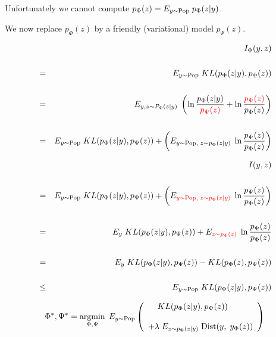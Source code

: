 {

Unfortunately we cannot compute {\color{red} $p_\Phi(z) = E_{y \sim \mathrm{Pop}}\;p_\Phi(z|y)$}.

\vfill
We now replace {\color{red} $p_\Phi(z)$} by a friendly (variational) model {\color{red} $p_\Psi(z)$}.

\begin{eqnarray*}
 & & I_\Phi(y,z) \\
 \\
 & = & E_{y \sim \mathrm{Pop}}\; KL(p_\Phi(z|y),p_\Phi(z)) \\
\\
& = & E_{y,z\sim P_\Phi(z|y)}\; \left(\ln \frac{p_\Phi(z|y)}{{\color{red} p_\Psi(z)}} + \ln \frac{{\color{red} p_\Psi(z)}}{p_\Phi(z)}\right) \\
\\
& = & E_{y \sim \mathrm{Pop}}\;KL(p_\Phi(z|y),p_\Psi(z)) + \left(E_{y \sim \mathrm{Pop},\;z\sim p_\Phi(z|y)}\;\ln \frac{p_\Psi(z)}{p_\Phi(z)}\right)
\end{eqnarray*}


\begin{eqnarray*}
 & & I(y,z) \\
 \\
 & = & E_{y \sim \mathrm{Pop}}\;KL(p_\Phi(z|y),p_\Psi(z)) + \left(E_{\color{red} y \sim \mathrm{Pop},\;z\sim p_\Phi(z|y)}\;\ln \frac{p_\Psi(z)}{p_\Phi(z)}\right) \\
\\
& = & E_y\;KL(p_\Phi(z|y),p_\Psi(z)) + E_{\color{red} z\sim p_\Phi(z)}\;\ln \frac{p_\Psi(z)}{p_\Phi(z)} \\
\\
& = & E_y\;KL(p_\Phi(z|y),p_\Psi(z)) - KL(p_\Phi(z),p_\Psi(z)) \\
\\
& \leq & E_{y \sim \mathrm{Pop}}\; KL(p_\Phi(z|y),p_\Psi(z))
\end{eqnarray*}



{\color{red} $$\Phi^*,\Psi^* = \operatorname*{argmin}_{\Phi,\Psi}\;E_{y\sim \mathrm{Pop}} \left(\begin{array}{l}\;\;\;\;KL(p_\Phi(z|y),p_\Psi(z)) \\
\\
+ \lambda \; E_{z\sim p_\Phi(z|y)}\;\mathrm{Dist}(y,\;y_\Phi(z))\end{array}\right)$$}



}
